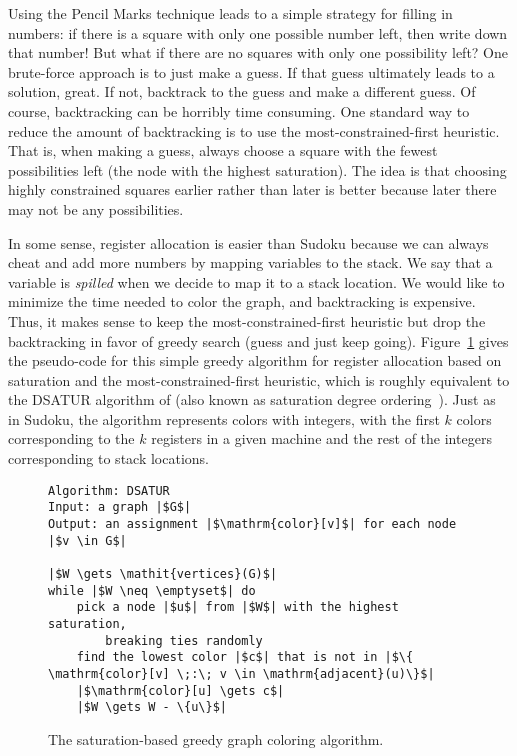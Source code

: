 \documentclass[11pt]{book}
\begin{document}
Using the Pencil Marks technique leads to a simple strategy for
filling in numbers: if there is a square with only one possible number
left, then write down that number! But what if there are no squares
with only one possibility left? One brute-force approach is to just
make a guess. If that guess ultimately leads to a solution, great.  If
not, backtrack to the guess and make a different guess.  Of course,
backtracking can be horribly time consuming. One standard way to
reduce the amount of backtracking is to use the most-constrained-first
heuristic. That is, when making a guess, always choose a square with
the fewest possibilities left (the node with the highest saturation).
The idea is that choosing highly constrained squares earlier rather
than later is better because later there may not be any possibilities.

In some sense, register allocation is easier than Sudoku because we
can always cheat and add more numbers by mapping variables to the
stack. We say that a variable is \emph{spilled} when we decide to map
it to a stack location. We would like to minimize the time needed to
color the graph, and backtracking is expensive. Thus, it makes sense
to keep the most-constrained-first heuristic but drop the backtracking
in favor of greedy search (guess and just keep going).
Figure~\ref{fig:satur-algo} gives the pseudo-code for this simple
greedy algorithm for register allocation based on saturation and the
most-constrained-first heuristic, which is roughly equivalent to the
DSATUR algorithm of \cite{Brelaz:1979eu} (also known as saturation
degree ordering~\citep{Gebremedhin:1999fk,Omari:2006uq}).  Just
as in Sudoku, the algorithm represents colors with integers, with the
first $k$ colors corresponding to the $k$ registers in a given machine
and the rest of the integers corresponding to stack locations.

\begin{figure}[btp]
  \centering
\begin{lstlisting}[basicstyle=\rmfamily,deletekeywords={for,from,with,is,not,in,find},morekeywords={while},columns=fullflexible]
Algorithm: DSATUR
Input: a graph |$G$|
Output: an assignment |$\mathrm{color}[v]$| for each node |$v \in G$|

|$W \gets \mathit{vertices}(G)$|
while |$W \neq \emptyset$| do
    pick a node |$u$| from |$W$| with the highest saturation,
        breaking ties randomly
    find the lowest color |$c$| that is not in |$\{ \mathrm{color}[v] \;:\; v \in \mathrm{adjacent}(u)\}$|
    |$\mathrm{color}[u] \gets c$|
    |$W \gets W - \{u\}$|
\end{lstlisting}
  \caption{The saturation-based greedy graph coloring algorithm.}
  \label{fig:satur-algo}
\end{figure}
\end{document}
